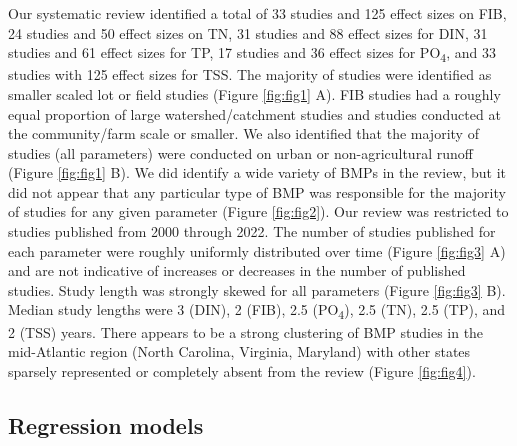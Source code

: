 \documentclass[utf8]{FrontiersinHarvard}
\begin{document}
Our systematic review identified a total of 33 studies and 125 effect sizes on FIB, 24 studies and 50 effect sizes on TN, 31 studies and 88 effect sizes for DIN, 31 studies and 61 effect sizes for TP, 17 studies and 36 effect sizes for PO\textsubscript{4}, and 33 studies with 125 effect sizes for TSS.
The majority of studies were identified as smaller scaled lot or field studies (Figure \ref{fig:fig1} A).
FIB studies had a roughly equal proportion of large watershed/catchment studies and studies conducted at the community/farm scale or smaller.
We also identified that the majority of studies (all parameters) were conducted on urban or non-agricultural runoff (Figure \ref{fig:fig1} B).
We did identify a wide variety of BMPs in the review, but it did not appear that any particular type of BMP was responsible for the majority of studies for any given parameter (Figure \ref{fig:fig2}).
Our review was restricted to studies published from 2000 through 2022.
The number of studies published for each parameter were roughly uniformly distributed over time (Figure \ref{fig:fig3} A) and are not indicative of increases or decreases in the number of published studies.
Study length was strongly skewed for all parameters (Figure \ref{fig:fig3} B). Median study lengths were 3 (DIN), 2 (FIB), 2.5 (PO\textsubscript{4}), 2.5 (TN), 2.5 (TP), and 2 (TSS) years.
There appears to be a strong clustering of BMP studies in the mid-Atlantic region (North Carolina, Virginia, Maryland) with other states sparsely represented or completely absent from the review (Figure \ref{fig:fig4}).

\hypertarget{regression-models}{%
\subsection{Regression models}\label{regression-models}}
\end{document}
